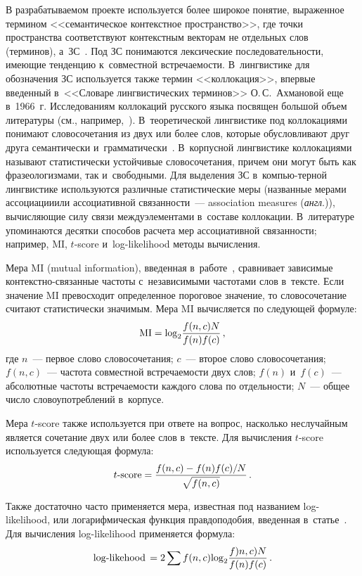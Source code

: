 \begin{multicols}{2}
     В разрабатываемом проекте используется более широкое понятие,
выраженное термином <<семантическое контекстное пространство>>, где точки пространства соответствуют контекстным векторам не
отдельных слов (терминов), а~ЗС~\cite{1-koz, 6-koz}. Под ЗС
понимаются лексические последовательности, имеющие тенденцию к~совместной встречаемости. В~лингвистике для обозначения
ЗС используется также термин <<коллокация>>, впервые
введенный в~<<Словаре лингвистических терминов>> О.\,С.~Ахмановой еще
в~1966~г. Исследованиям коллокаций русского языка посвящен большой
объем литературы (см., например,~\cite{29-koz, 30-koz}). В~теоретической
лингвисти\-ке под коллокациями понимают словосочетания из двух или более
слов, которые обуслов\-ли\-ва\-ют друг друга семантически и~грамматически~\cite{31-koz}. В~корпусной лингвистике коллокациями
называют статистически устойчивые словосочетания, причем они могут быть
как фразеологизмами, так и~свободными. Для выделения ЗС в~компью-\linebreak терной
лингвистике используются различные статистические меры (названные
мерами ассоциации\linebreak или ассоциативной связанности~---
 association
measures (\textit{англ}.)), вы\-чис\-ля\-ющие силу связи между\linebreak элементами в~составе
коллокации. В~литературе упоминаются десятки способов расчета мер
ассоциативной связанности; например, MI, $t$-score
     и~log-likelihood методы вычисления.

     Мера MI (mutual information), введенная в~работе~\cite{15-koz}, сравнивает зависимые кон\-текст\-но-свя\-зан\-ные
частоты с~независимыми частотами слов в~тексте. Если значение MI
превосходит определенное пороговое значение, то словосочетание считают
статистически значимым. Мера MI вы\-чис\-ля\-ет\-ся по следующей формуле:
     $$
    \mathrm{MI}= \mathrm{log}_2 \displaystyle\frac{\displaystyle f(n,c) N\mathstrut}{\displaystyle f(n) f(c)\mathstrut}\,,
     $$
где $n$~--- первое слово словосочетания; $c$~--- второе слово
словосочетания; $f(n, c)$~--- частота совместной встречаемости двух слов;
$f(n)$ и~$f(c)$~--- абсолютные частоты встречаемости каждого слова по
отдельности; $N$~--- общее число словоупотреблений в~корпусе.

     Мера $t$-score также используется при ответе на вопрос,
насколько неслучайным является сочетание двух или более слов в~тексте.
Для вычисления $t$-score используется следующая формула:
     $$
     t\mbox{-}\mathrm{score} = \displaystyle\frac{\displaystyle f(n,c)-f(n) f(c)/N\mathstrut}{\displaystyle \sqrt{f(n,c)}\mathstrut}\,.
     $$

     Также достаточно часто применяется мера, известная под названием
log-likelihood, или логарифмическая функция правдоподобия, введенная в~\mbox{статье}~\cite{16-koz}. Для вычисления log-likelihood
применяется формула:
     $$
     \mathrm{log}\mbox{-}\mathrm{likehood}\,= 2\sum f(n,c)  \mathrm{log}_2
\displaystyle\frac{\displaystyle f)n,c) N\mathstrut}{\displaystyle f(n) f(c)\mathstrut}\,.
     $$


\end{multicols}

